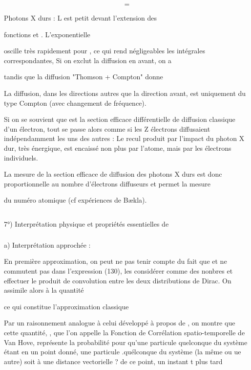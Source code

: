 {{{%
\[
\tag{141}=
\]

 Photons X durs : L est petit devant l'extension des

fonctions  et . L'exponentielle 

oscille très rapidement
pour , ce qui rend négligeables les intégrales correspondantes, Si on
exclut la diffusion en avant, on a

tandis que la diffusion "Thomson + Compton" donne

La diffusion, dans les directions autres que la direction avant,
est uniquement du type Compton (avec changement de fréquence).

Si on se souvient que  est la section efficace
différentielle de diffusion classique d'un électron, tout se passe alors
comme si les Z électrons diffusaient indépendamment les uns des autres : Le
recul produit par l'impact du photon X dur, très énergique, est encaissé non
plus par l'atome, mais par les électrons individuels.

La mesure de la section efficace de diffusion des photons X durs
est donc proportionnelle au nombre d'électrons diffuseurs et permet la mesure

du numéro atomique (cf expériences de Bækla).
 

\subsection{}%
7°) Interprétation physique et propriétés essentielles de
\subsubsection{}%
a) Interprétation approchée :

En première approximation, on peut ne pas tenir compte du
fait que  et ne commutent pas dans l'expression (130), les
considérer comme des nonbres et effectuer le produit de convolution entre
les deux distributions de Dirac. On assimile alors  à la quantité

ce qui constitue l'approximation classique

Par un raisonnement analogue à celui développé à propos de
, on montre que cette quantité, , que l'on appelle la
Fonction de Corrélation spatio-temporelle de Van Hove, représente la probabilité
pour qu'une particule quelconque du système étant en un point donné,
une particule .quélconque du système (la même ou ue autre) soit à une distance
vectorielle ? de ce point, un instant t plus tard
}}}
